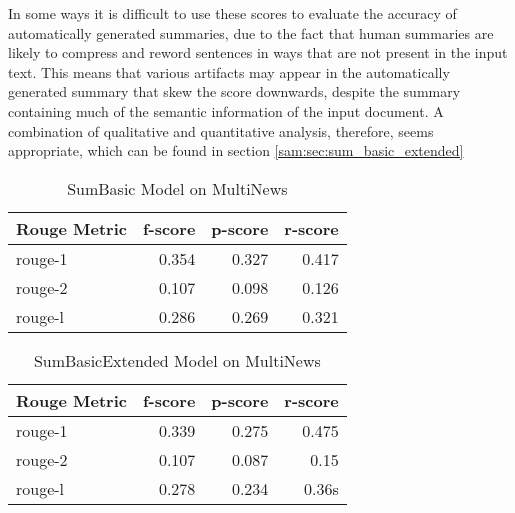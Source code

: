 \documentclass[../writeup.tex]{subfiles}
\begin{document}
In some ways it is difficult to use these scores to evaluate the accuracy of automatically generated summaries, due to the fact that human summaries are likely to compress and reword sentences in ways that are not present in the input text.
This means that various artifacts may appear in the automatically generated summary that skew the score downwards, despite the summary containing much of the semantic information of the input document.
A combination of qualitative and quantitative analysis, therefore, seems appropriate, which can be found in section \ref{sam:sec:sum_basic_extended}

\begin{table}[h]
    \caption{SumBasic Model on MultiNews}
    \begin{center}
        \begin{tabular}{lrrr}
            \hline
            Rouge Metric & f-score & p-score & r-score \\
            \hline
            rouge-1      & 0.354   & 0.327   & 0.417   \\
            rouge-2      & 0.107   & 0.098   & 0.126   \\
            rouge-l      & 0.286   & 0.269   & 0.321   \\
            \hline
        \end{tabular}
    \end{center}
    \label{sam:fig:sum_basic_multi}
\end{table}%
\begin{table}[h]
    \caption{SumBasicExtended Model on MultiNews}
    \begin{center}
        \begin{tabular}{lrrr}
            \hline
            Rouge Metric & f-score & p-score & r-score \\
            \hline
            rouge-1      & 0.339   & 0.275   & 0.475   \\
            rouge-2      & 0.107   & 0.087   & 0.15  \\
            rouge-l      & 0.278   & 0.234   & 0.36s   \\
            \hline
        \end{tabular}
    \end{center}
    \label{sam:fig:extended_multi}
\end{table}
\end{document}
